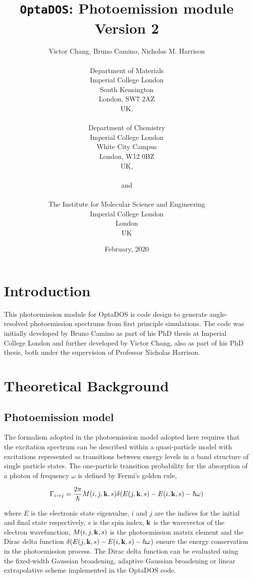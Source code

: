 \documentclass[a4paper,11pt,twoside]{book}
\title{{\huge {\tt OptaDOS}: Photoemission module}\\ {Version 2}}
\author{Victor Chang, Bruno Camino, Nicholas M. Harrison \\
\\
Department of Materials\\
Imperial College London\\
South Kensington\\
London, SW7 2AZ\\
UK,\\
\\
Department of Chemistry\\
Imperial College London\\
White City Campus\\
London, W12 0BZ\\
UK,\\
\\
{\small and} \\
\\
The Institute for Molecular Science and Engineering\\
Imperial College London\\
London\\
UK}
\date{February, 2020}
\begin{document}
\newcommand{\optados}{\textsc{OptaDOS}}
\newcommand{\lindos}{\texttt{LinDOS}}
\newcommand{\onetep}{\textsc{onetep}}
\newcommand{\castep}{\textsc{castep}}
\maketitle

 \thispagestyle{empty}







\chapter{Introduction}\label{chap:introduction}

This photoemission module for OptaDOS is code design to generate angle-resolved photoemission spectrums from first principle simulations. The code was initially developed by Bruno Camino as part of his PhD thesis at Imperial College London and further developed by Victor Chang, also as part of his PhD thesis, both under the supervision of Professor Nicholas Harrison.


\chapter{Theoretical Background} \label{sec:theory}

\section{Photoemission model}

The formalism adopted in the photoemission model adopted here requires that the excitation spectrum can be described within a quasi-particle model with excitations represented as transitions between energy levels in a  band structure of single particle states. The one-particle transition probability for the absorption of a photon of frequency $\omega$ is defined by Fermi's golden rule,

\begin{equation}
\Gamma_{i \rightarrow j} = \frac{2 \pi}{\hbar} M (i,j,{\bf{k}},s  ) \delta(E{(j,{\bf{k}},s)}-E{(i,{\bf{k}},s)}-\hbar \omega  )
    \label{fermi_golden_rule}
\end{equation}

where $E$ is the electronic state eigenvalue, $i$ and $j$ are the indices for the initial and final state respectively, $s$ is the spin index, $\bf{k}$ is the wavevector of the electron wavefunction, $M(i,j,{\bf{k}},s)$ is the photoemission matrix element and the Dirac delta function $\delta(E{(j,{\bf{k}},s)}-E{(i,{\bf{k}},s)}-\hbar \omega)$ ensure the energy conservation in the photoemission process. The Dirac delta function can be evaluated using the fixed-width Gaussian broadening, adaptive Gaussian broadening or linear extrapolative scheme implemented in the OptaDOS code. 
\end{document}
